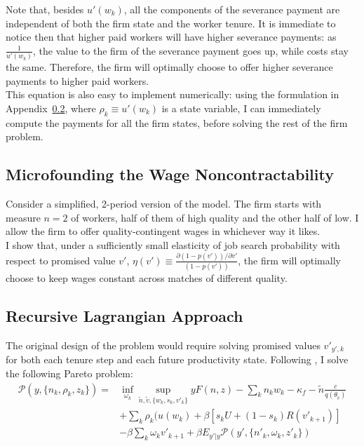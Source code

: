 Note that, besides $u'(w_k)$, all the components of the severance payment are independent of both the firm state and the worker tenure. 
It is immediate to notice then that higher paid workers will have higher severance payments: as $\frac{1}{u'(w_k)}$, the value to the firm of the severance payment goes up, while costs stay the same. Therefore, the firm will optimally choose to offer higher severance payments to higher paid workers. \\
This equation is also easy to implement numerically: using the formulation in Appendix~\ref{dual}, where $\rho_k\equiv u'(w_k)$ is a state variable, I can immediately compute the payments for all the firm states, before solving the rest of the firm problem.
\subsection{Microfounding the Wage Noncontractability} \label{microfoundation}
Consider a simplified, 2-period version of the model. The firm starts with measure $n=2$ of workers, half of them of high quality and the other half of low. I allow the firm to offer quality-contingent wages in whichever way it likes. \\
I show that, under a sufficiently small elasticity of job search probability with respect to promised value $v'$, $\eta(v')\equiv\frac{\partial (1-p(v')) /\partial v'}{(1-p(v'))}$, the firm will optimally choose to keep wages constant across matches of different quality.
\subsection{Recursive Lagrangian Approach} \label{dual}
The original design of the problem would require solving promised values $v'_{y',k}$ for both each tenure step and each future productivity state. Following \textcite{balke2022}, I solve the following Pareto problem:
\begin{equation*}
\begin{split}
\mathcal{P}(y,\{n_k,\rho_k,z_k\}) = &\inf_{\omega_k} \sup_{\tilde{n},\tilde{v},\{w_k,s_k,v'_k\}}  yF(n,z) - \sum_k n_kw_k - \kappa_f - \tilde{n}\frac{c}{q(\theta_{\tilde{v}})}   \\
& + \sum_k\rho_k(u(w_k)+\beta[s_kU+(1-s_k)R(v'_{k+1})] \\
& -\beta\sum_k \omega_k v'_{k+1}+\beta E_{y'|y}\mathcal{P}(y',\{n'_k,\omega_k,z'_k\})    
\end{split}
\end{equation*}

